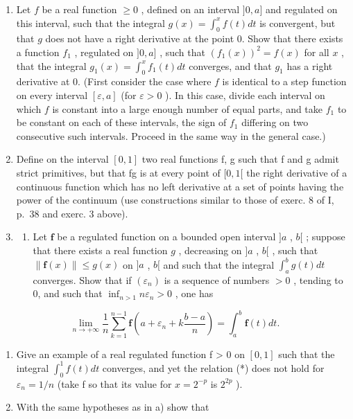 \begin{enumerate}
\def\labelenumi{\arabic{enumi})}
\setcounter{enumi}{2}
\item
  Let \(f\) be a real function \(\geqslant 0\) , defined on an interval \(]0, a]\) and regulated on this interval, such that the integral \(g(x) = \int_0^x f(t)dt\) is convergent, but that \(g\) does not have a right derivative at the point 0. Show that there exists a function \(f_1\) , regulated on \(]0, a]\) , such that \((f_1(x))^2 = f(x)\) for all \(x\) , that the integral \(g_1(x) = \int_0^x f_1(t)dt\) converges, and that \(g_1\) has a right derivative at 0. (First consider the case where \(f\) is identical to a step function on every interval \([\varepsilon, a]\) (for \(\varepsilon > 0\) ). In this case, divide each interval on which \(f\) is constant into a large enough number of equal parts, and take \(f_1\) to be constant on each of these intervals, the sign of \(f_1\) differing on two consecutive such intervals. Proceed in the same way in the general case.)
\item
  Define on the interval \([0,1]\) two real functions f, g such that f and g admit strict primitives, but that fg is at every point of \([0,1[\) the right derivative of a continuous function which has no left derivative at a set of points having the power of the continuum (use constructions similar to those of exerc. 8 of I, p.~38 and exerc. 3 above).
\item
  \begin{enumerate}
  \def\labelenumii{\alph{enumii})}
  \tightlist
  \item
    Let \(\mathbf{f}\) be a regulated function on a bounded open interval \(]a\) , \(b[\) ; suppose that there exists a real function \(g\) , decreasing on \(]a\) , \(b[\) , such that \(\| \mathbf{f}(x) \| \leqslant g(x)\) on \(]a\) , \(b[\) and such that the integral \(\int_{a}^{b} g(t) dt\) converges. Show that if \((\varepsilon_n)\) is a sequence of numbers \(>0\) , tending to 0, and such that \(\inf_{n > 1} n \varepsilon_n > 0\) , one has
  \end{enumerate}
\end{enumerate}

\[
\lim _ {n \rightarrow + \infty} \frac {1}{n} \sum_ {k = 1} ^ {n - 1} \mathbf {f} \left(a + \varepsilon_ {n} + k \frac {b - a}{n}\right) = \int_ {a} ^ {b} \mathbf {f} (t) d t.\tag{*}
\]

\begin{enumerate}
\def\labelenumi{\alph{enumi})}
\setcounter{enumi}{1}
\item
  Give an example of a real regulated function f \textgreater{} 0 on \([0,1]\) such that the integral \(\int_{0}^{1} f(t) dt\) converges, and yet the relation (*) does not hold for \(\varepsilon_{n} = 1/n\) (take f so that its value for \(x = 2^{-p}\) is \(2^{2p}\) ).
\item
  With the same hypotheses as in a) show that
\end{enumerate}

